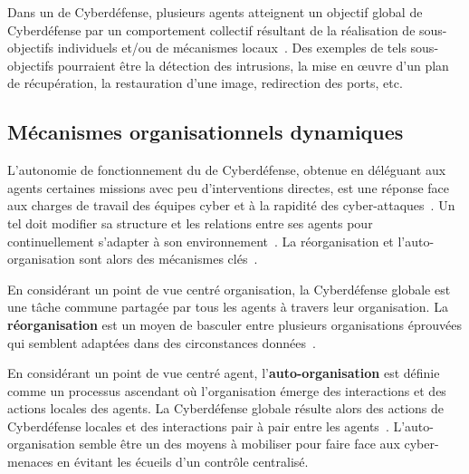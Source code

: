 Dans un  de Cyberdéfense, plusieurs agents atteignent un objectif global de Cyberdéfense par un comportement collectif résultant de la réalisation de sous-objectifs individuels et/ou de mécanismes locaux~\cite{jamont2015meeting}.
Des exemples de tels sous-objectifs pourraient être la détection des intrusions, la mise en œuvre d'un plan de récupération, la restauration d'une image, redirection des ports, etc.

\subsection{Mécanismes organisationnels dynamiques}

L'autonomie de fonctionnement du  de Cyberdéfense, obtenue en déléguant aux agents certaines missions avec peu d'interventions directes, est une réponse face aux charges de travail des équipes cyber et à la rapidité des cyber-attaques~\cite{ieeesp_KottT20}.
Un tel  doit modifier sa structure et les relations entre ses agents pour continuellement s'adapter à son environnement~\cite{theron_autonomous_2021}.
La réorganisation et l'auto-organisation sont alors des mécanismes clés~\cite{Picard2009reorganisation}.

En considérant un point de vue centré organisation, la Cyberdéfense globale est une tâche commune partagée par tous les agents à travers leur organisation.
La \textbf{réorganisation} est un moyen de basculer entre plusieurs organisations éprouvées qui semblent adaptées dans des circonstances données~\cite{Picard2009reorganisation}.

En considérant un point de vue centré agent, l'\textbf{auto-organisation} est définie comme un processus ascendant où l'organisation émerge des interactions et des actions locales des agents.
La Cyberdéfense globale résulte alors des actions de Cyberdéfense locales et des interactions pair à pair entre les agents~\cite{Picard2009reorganisation}.
L'auto-organisation semble être un des moyens à mobiliser pour faire face aux cyber-menaces en évitant les écueils d'un contrôle centralisé.




